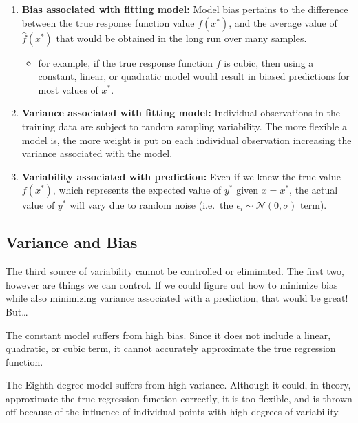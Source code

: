 \documentclass[
  letterpaper,
  DIV=11,
  numbers=noendperiod]{scrreprt}
\providecommand{\tightlist}{%
  \setlength{\itemsep}{0pt}\setlength{\parskip}{0pt}}\usepackage{longtable,booktabs,array}
\begin{document}
\begin{enumerate}
\def\labelenumi{\arabic{enumi}.}
\item
  \textbf{Bias associated with fitting model:} Model bias pertains to
  the difference between the true response function value \(f(x^*)\),
  and the average value of \(\hat{f}(x^*)\) that would be obtained in
  the long run over many samples.\\

  \begin{itemize}
  \tightlist
  \item
    for example, if the true response function \(f\) is cubic, then
    using a constant, linear, or quadratic model would result in biased
    predictions for most values of \(x^*\).
  \end{itemize}
\item
  \textbf{Variance associated with fitting model:} Individual
  observations in the training data are subject to random sampling
  variability. The more flexible a model is, the more weight is put on
  each individual observation increasing the variance associated with
  the model.
\item
  \textbf{Variability associated with prediction:} Even if we knew the
  true value \(f(x^*)\), which represents the expected value of \(y^*\)
  given \(x=x^*\), the actual value of \(y^*\) will vary due to random
  noise (i.e.~the \(\epsilon_i\sim\mathcal{N}(0,\sigma)\) term).
\end{enumerate}

\subsection{Variance and Bias}\label{variance-and-bias}

The third source of variability cannot be controlled or eliminated. The
first two, however are things we can control. If we could figure out how
to minimize bias while also minimizing variance associated with a
prediction, that would be great! But\ldots{}

The constant model suffers from high bias. Since it does not include a
linear, quadratic, or cubic term, it cannot accurately approximate the
true regression function.

The Eighth degree model suffers from high variance. Although it could,
in theory, approximate the true regression function correctly, it is too
flexible, and is thrown off because of the influence of individual
points with high degrees of variability.
\end{document}
